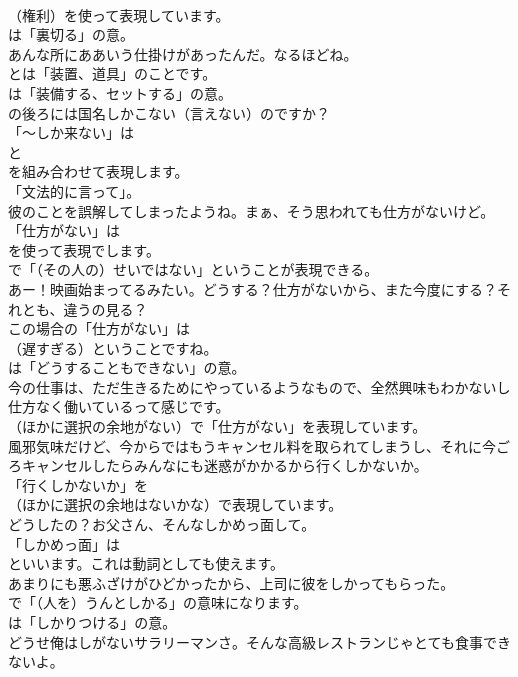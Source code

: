 \documentclass[8pt]{extreport}
\begin{document}
\begin{CJK}{UTF8}{min}
\\	（権利）を使って表現しています。
\\	は「裏切る」の意。	
\\	あんな所にああいう仕掛けがあったんだ。なるほどね。 
\\	とは「装置、道具」のことです。
\\	は「装備する、セットする」の意。	
\\	の後ろには国名しかこない（言えない）のですか？ 
\\	「～しか来ない」は
\\	と
\\	を組み合わせて表現します。
\\	「文法的に言って」。	
\\	彼のことを誤解してしまったようね。まぁ、そう思われても仕方がないけど。 
\\	「仕方がない」は
\\	を使って表現でします。
\\	で「（その人の）せいではない」ということが表現できる。	
\\	あー！映画始まってるみたい。どうする？仕方がないから、また今度にする？それとも、違うの見る？ 
\\	この場合の「仕方がない」は 
\\	（遅すぎる）ということですね。
\\	は「どうすることもできない」の意。	
\\	今の仕事は、ただ生きるためにやっているようなもので、全然興味もわかないし仕方なく働いているって感じです。 
\\	（ほかに選択の余地がない）で「仕方がない」を表現しています。	
\\	風邪気味だけど、今からではもうキャンセル料を取られてしまうし、それに今ごろキャンセルしたらみんなにも迷惑がかかるから行くしかないか。 
\\	「行くしかないか」を
\\	（ほかに選択の余地はないかな）で表現しています。	
\\	どうしたの？お父さん、そんなしかめっ面して。 
\\	「しかめっ面」は
\\	といいます。これは動詞としても使えます。	
\\	あまりにも悪ふざけがひどかったから、上司に彼をしかってもらった。 
\\	で「（人を）うんとしかる」の意味になります。
\\	は「しかりつける」の意。	
\\	どうせ俺はしがないサラリーマンさ。そんな高級レストランじゃとても食事できないよ。 

\end{CJK}
\end{document}
